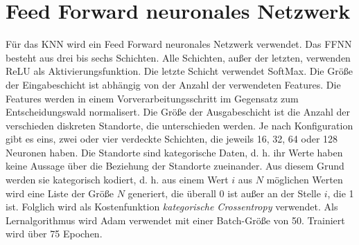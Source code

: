 \section{Feed Forward neuronales Netzwerk}
\label{sec:model_ffnn}
Für das KNN wird ein Feed Forward neuronales Netzwerk verwendet.
Das FFNN besteht aus drei bis sechs Schichten.
Alle Schichten, außer der letzten, verwenden ReLU als Aktivierungsfunktion.
Die letzte Schicht verwendet SoftMax.
\newline
\newline
Die Größe der Eingabeschicht ist abhängig von der Anzahl der verwendeten Features.
Die Features werden in einem Vorverarbeitungsschritt im Gegensatz zum Entscheidungswald normalisert.
Die Größe der Ausgabeschicht ist die Anzahl der verschieden diskreten Standorte, die unterschieden werden.
Je nach Konfiguration gibt es eins, zwei oder vier verdeckte Schichten, die jeweils 16, 32, 64 oder 128 Neuronen haben.
\newline
\newline
Die Standorte sind kategorische Daten, d. h. ihr Werte haben keine Aussage über die Beziehung der Standorte zueinander.
Aus diesem Grund werden sie kategorisch kodiert, d. h. aus einem Wert $i$ aus $N$ möglichen Werten wird eine Liste der Größe $N$ generiert,
die überall 0 ist außer an der Stelle $i$, die 1 ist.
Folglich wird als Kostenfunktion \textit{kategorische Crossentropy} verwendet.
Als Lernalgorithmus wird Adam verwendet mit einer Batch-Größe von 50.
Trainiert wird über 75 Epochen.